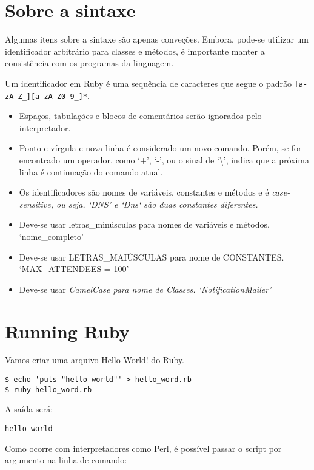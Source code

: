 \documentclass[serif,mathserif]{book}
\begin{document}
\section{Sobre a sintaxe}

Algumas itens sobre a sintaxe são apenas conveções. Embora, pode-se utilizar um identificador arbitrário para classes 
e métodos, é importante manter a consistência com os programas da linguagem.
 
Um identificador em Ruby é uma sequência de caracteres que segue o padrão \verb|[a-zA-Z_][a-zA-Z0-9_]*|.
 
\begin{itemize}
  \item  Espaços, tabulações e blocos de comentários serão ignorados pelo interpretador.
  \item  Ponto-e-vírgula e nova linha é considerado um novo comando. Porém, se for encontrado um operador, como `+', `-', ou o sinal de `\textbackslash', indica que a 
próxima linha é continuação do comando atual.
  \item  Os identificadores são nomes de variáveis, constantes e métodos e é \em{case-sensitive}, ou seja, `DNS' e `Dns` são duas constantes diferentes.
  \item  Deve-se usar letras\_minúsculas para nomes de variáveis e métodos. `nome\_completo'
  \item  Deve-se usar LETRAS\_MAIÚSCULAS para nome de CONSTANTES. `MAX\_ATTENDEES = 100'
  \item  Deve-se usar \em{CamelCase} para nome de Classes. `NotificationMailer'
\end{itemize}
 
\section {Running Ruby} 

Vamos criar uma arquivo Hello World! do Ruby.

\begin{lstlisting}[style=BashInputStyle]
$ echo 'puts "hello world"' > hello_word.rb
$ ruby hello_word.rb
\end{lstlisting}

A saída será: 

\begin{lstlisting}[style=BashOutputStyle]
hello world
\end{lstlisting}

Como ocorre com interpretadores como Perl, é possível passar o script por argumento na linha de comando:
\end{document}
